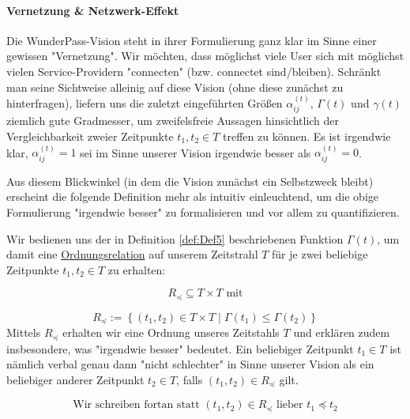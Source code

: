 \documentclass[11pt]{scrartcl}
\begin{document}
\paragraph{Vernetzung \& Netzwerk-Effekt}
\label{sec:zahlen_status_quo_netzwerk_effekt}

\textrm{ }
\vspace{0.3cm}

Die WunderPass-Vision steht in ihrer Formulierung ganz klar im Sinne einer gewissen "Vernetzung". Wir möchten, dass möglichst viele User sich mit möglichst vielen Service-Providern "connecten" (bzw. connectet sind/bleiben). Schränkt man seine Sichtweise alleinig auf diese Vision (ohne diese zunächst zu hinterfragen), liefern uns die zuletzt eingeführten Größen $\alpha^{(t)}_{ij}$, $\Gamma(t)$ und $\gamma(t)$ ziemlich gute Gradmesser, um zweifelsfreie Aussagen hinsichtlich der Vergleichbarkeit zweier Zeitpunkte $t_1, t_2 \in T$ treffen zu können. Es ist irgendwie klar, $\alpha^{(t)}_{ij} = 1$ sei im Sinne unserer Vision irgendwie besser als $\alpha^{(t)}_{ij} = 0$.

Aus diesem Blickwinkel (in dem die Vision zunächst ein Selbstzweck bleibt) erscheint die folgende Definition mehr als intuitiv einleuchtend, um die obige Formulierung "irgendwie besser" zu formalisieren und vor allem zu quantifizieren. 

\vspace{0.3cm}

\begin{Def}\label{def:Def7}

Wir bedienen uns der in Definition \ref{def:Def5} beschriebenen Funktion $\Gamma(t)$, um damit eine \href{https://de.wikipedia.org/wiki/Ordnungsrelation}{Ordnungsrelation} 
auf unserem Zeitstrahl $T$ für je zwei beliebige Zeitpunkte $t_1, t_2 \in T$ zu erhalten: 

\vspace{0.3cm}

\begin{equation*}
  R_{\preceq} \subseteq T \times T \textrm{ mit}
\end{equation*}

\begin{equation*}
  R_{\preceq}:= \left\{ (t_1, t_2) \in T \times T \mid \Gamma(t_1) \leq \Gamma(t_2) \right\}
\end{equation*}
\vspace{1cm}
Mittels $R_{\preceq}$ erhalten wir eine Ordnung unseres Zeitstahls $T$ und erklären zudem insbesondere, was "irgendwie besser" bedeutet. Ein beliebiger Zeitpunkt $t_1 \in T$ ist nämlich verbal genau dann "nicht schlechter" in Sinne unserer Vision als ein beliebiger anderer Zeitpunkt $t_2 \in T$, falls $(t_1, t_2) \in R_{\preceq}$ gilt.

\vspace{0.3cm}

\begin{equation*}
  \textrm{Wir schreiben fortan statt } (t_1, t_2) \in R_{\preceq} \textrm{ lieber } t_1 \preceq t_2 
\end{equation*}

\end{Def}
\end{document}
